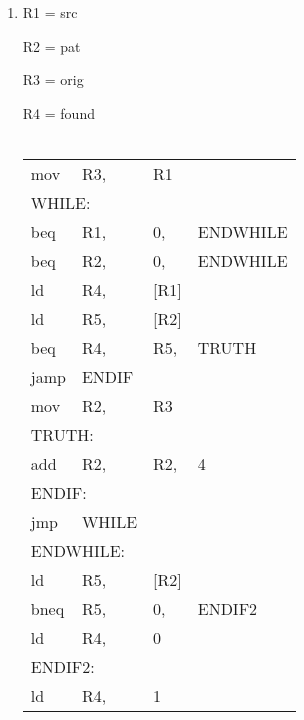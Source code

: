 \documentclass{article}
\begin{document}
\begin{enumerate}
  \pagebreak
\item
  R1 = src

  R2 = pat

  R3 = orig

  R4 = found\\\\
  \begin{tabular}{llll}
    mov &R3, &R1\\
    \multicolumn{3}{l}{WHILE:}\\
    beq &R1, &0,&ENDWHILE\\
    beq &R2, &0,&ENDWHILE\\
    ld &R4, &[R1]\\
    ld &R5, &[R2]\\
    beq &R4, &R5, &TRUTH\\
    jamp& ENDIF\\
    mov &R2, &R3\\
    \multicolumn{3}{l}{TRUTH:}\\
    add &R2, &R2,& 4\\
    \multicolumn{3}{l}{ENDIF:}\\
    jmp &WHILE\\
    \multicolumn{3}{l}{ENDWHILE:}\\
    ld& R5, &[R2]\\
    bneq & R5,&0,&ENDIF2\\
    ld &R4,& 0\\
    \multicolumn{3}{l}{ENDIF2:}\\
    ld &R4, &1
  \end{tabular}


\end{enumerate}
\end{document}
